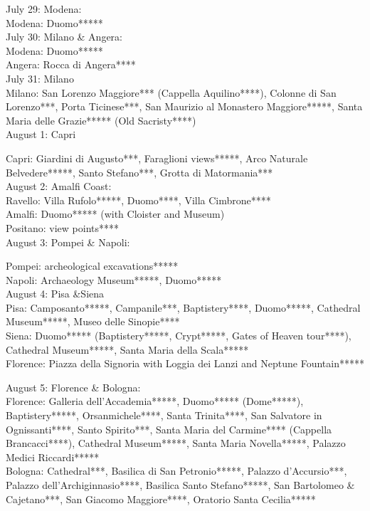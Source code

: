 July 29: Modena: \\

Modena: Duomo*****\\

July 30: Milano \& Angera: \\

Modena: Duomo*****\\
Angera: Rocca di Angera****\\

July 31: Milano\\

Milano: San Lorenzo Maggiore*** (Cappella Aquilino****), Colonne di San Lorenzo***, Porta Ticinese***, San Maurizio al Monastero Maggiore*****, Santa Maria delle Grazie***** (Old Sacristy****)\\

August 1: Capri

Capri: Giardini di Augusto***, Faraglioni views*****, Arco Naturale Belvedere*****, Santo Stefano***, Grotta di Matormania***\\

August 2: Amalfi Coast:\\

Ravello: Villa Rufolo*****, Duomo****, Villa Cimbrone****\\
Amalfi: Duomo***** (with Cloister and Museum)\\
Positano: view points****\\

August 3: Pompei \& Napoli:

Pompei: archeological excavations*****\\
Napoli: Archaeology Museum*****, Duomo*****\\

August 4: Pisa \&Siena\\

Pisa: Camposanto*****, Campanile***, Baptistery****, Duomo*****, Cathedral Museum*****, Museo delle Sinopie****\\
Siena: Duomo***** (Baptistery*****, Crypt*****, Gates of Heaven tour****), Cathedral Museum*****, Santa Maria della Scala*****\\
Florence: Piazza della Signoria with Loggia dei Lanzi and Neptune Fountain*****

August 5: Florence \& Bologna:\\

Florence: Galleria dell'Accademia*****, Duomo***** (Dome*****), Baptistery*****, Orsanmichele****, Santa Trinita****, San Salvatore in Ognissanti****, Santo Spirito***, Santa Maria del Carmine**** (Cappella Brancacci****), Cathedral Museum*****, Santa Maria Novella*****,
Palazzo Medici Riccardi*****\\
Bologna: Cathedral***, Basilica di San Petronio*****, Palazzo d'Accursio***, Palazzo dell'Archiginnasio****, Basilica Santo Stefano*****, San Bartolomeo \& Cajetano***, San Giacomo Maggiore****, Oratorio Santa Cecilia*****\\

